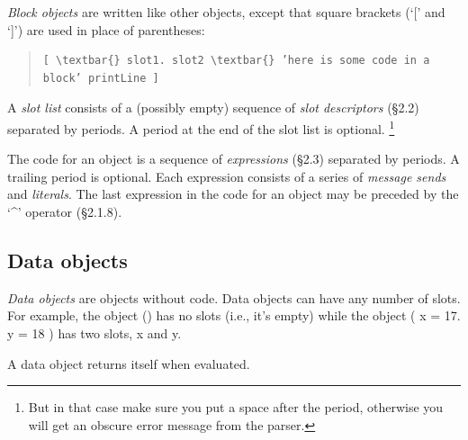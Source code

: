 \documentclass[letterpaper,10pt,english]{sphinxmanual}
\begin{document}
\emph{Block objects} are written like other objects, except that square brackets (‘{[}’ and ‘{]}’) are used in
place of parentheses:
\begin{quote}

\begin{Verbatim}[commandchars=\\\{\}]
[ \textbar{} slot1. slot2 \textbar{} ’here is some code in a block’ printLine ]
\end{Verbatim}
\end{quote}

A \emph{slot list} consists of a (possibly empty) sequence of \emph{slot descriptors} (\S{}2.2) separated by periods.
A period at the end of the slot list is optional. \footnote{
But in that case make sure you put a space after the period, otherwise you will get an obscure error message from the parser.
}

The code for an object is a sequence of \emph{expressions} (\S{}2.3) separated by periods. A trailing period
is optional. Each expression consists of a series of \emph{message sends} and \emph{literals}. The last expression
in the code for an object may be preceded by the ‘\textasciicircum{}’ operator (\S{}2.1.8).


\subsection{Data objects}
\label{langref:index-5}\label{langref:data-objects}
\emph{Data objects} are objects without code. Data objects can have any number of slots. For example, the
object () has no slots (i.e., it’s empty) while the object ( \textbar{} x = 17. y = 18 \textbar{} ) has two slots,
x and y.
\begin{figure}[htbp]\begin{flushleft}

\end{flushleft}\end{figure}

A data object returns itself when evaluated.
\end{document}
